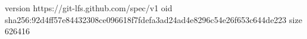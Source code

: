 version https://git-lfs.github.com/spec/v1
oid sha256:92d4ff57e84432308ce096618f7fdefa3ad24ad4e8296c54e26f653c644de223
size 626416
